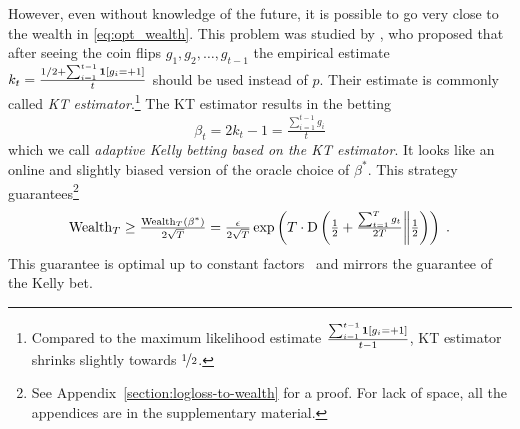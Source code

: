 However, even without knowledge of the future, it is possible to go very close
to the wealth in \eqref{eq:opt_wealth}.  This problem was studied by
\citet{Krichevsky-Trofimov-1981}, who proposed that after seeing the coin flips
$g_1, g_2, \dots, g_{t-1}$ the empirical estimate $k_t = \frac{1/2 +
\sum_{i=1}^{t-1} \mathbf{1}[g_i = +1]}{t}$ should be used instead of $p$. Their
estimate is commonly called \emph{KT estimator}.\footnote{Compared to the
maximum likelihood estimate $\frac{\sum_{i=1}^{t-1} \mathbf{1}[g_i =
+1]}{t-1}$, KT estimator shrinks slightly towards $\nicefrac{1}{2}$.} The KT
estimator results in the betting
\begin{equation}
\label{equation:kt-estimator-betting-strategy}
\beta_t = 2k_t - 1 = \tfrac{\sum_{i=1}^{t-1} g_i}{t}
\end{equation}
which we call \emph{adaptive Kelly betting based on the KT estimator}. It looks
like an online and slightly biased version of the oracle choice of $\beta^*$.
This strategy guarantees\footnote{See Appendix~\ref{section:logloss-to-wealth}
for a proof. For lack of space, all the appendices are in the supplementary
material.}
\[
\operatorname{Wealth}_T
\ge \tfrac{\operatorname{Wealth}_T(\beta^*)}{2\sqrt{T}}
= \tfrac{\epsilon}{2\sqrt{T}} \exp\left(T \cdot \operatorname{D}\left({\tfrac{1}{2}+\tfrac{\sum_{t=1}^T g_t}{2T}}\middle\|{\tfrac{1}{2}}\right)\right)\; .
\]
This guarantee is optimal up to constant
factors~\citep{Cesa-Bianchi-Lugosi-2006} and mirrors the guarantee of the Kelly
bet.

